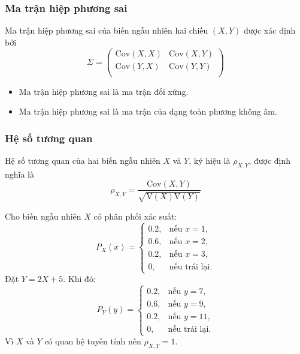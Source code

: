 \documentclass[12pt,a4paper]{article}
\begin{document}
\subsubsection{Ma trận hiệp phương sai}

\begin{dinhnghia}[title={Ma trận hiệp phương sai}]
  Ma trận hiệp phương sai của biến ngẫu nhiên hai chiều $(X, Y)$ được xác định bởi
  \[
    \displaystyle\Sigma = \begin{pmatrix}
      \mathrm{Cov}(X, X) & \mathrm{Cov}(X, Y) \\
      \mathrm{Cov}(Y, X) & \mathrm{Cov}(Y, Y) \\
    \end{pmatrix}
  \]
\end{dinhnghia}

\begin{tinhchat}
\begin{itemize}
  \item Ma trận hiệp phương sai là ma trận đối xứng.
  \item Ma trận hiệp phương sai là ma trận của dạng toàn phương không âm.
\end{itemize}
\end{tinhchat}

\subsubsection{Hệ số tương quan}

\begin{dinhnghia}
  Hệ số tương quan của hai biến ngẫu nhiên $X$ và $Y$, ký hiệu là $\rho_{X,Y}$, được định nghĩa là
  \[
    \rho_{X,Y} = \dfrac{\mathrm{Cov}(X, Y)}{\sqrt{\mathrm{V}(X)\mathrm{V}(Y)}}
  \]
\end{dinhnghia}

\begin{vidu}
Cho biến ngẫu nhiên $X$ có phân phối xác suất:
\[
  P_X(x) = \begin{cases}
    0.2, & \text{nếu } x = 1, \\
    0.6, & \text{nếu } x = 2, \\
    0.2, & \text{nếu } x = 3, \\
    0, & \text{nếu trái lại.}
  \end{cases}
\]
Đặt $Y = 2X + 5$. Khi đó:
\[
  P_Y(y) = \begin{cases}
    0.2, & \text{nếu } y = 7, \\
    0.6, & \text{nếu } y = 9, \\
    0.2, & \text{nếu } y = 11, \\
    0, & \text{nếu trái lại.}
  \end{cases}
\]
Vì $X$ và $Y$ có quan hệ tuyến tính nên $\rho_{X,Y} = 1$.
\end{vidu}
\end{document}
